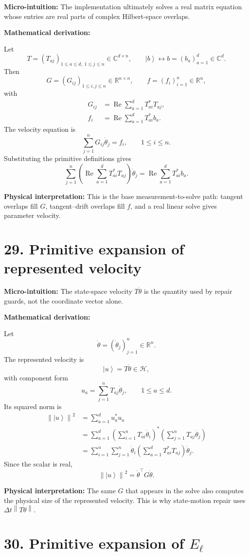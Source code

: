 \documentclass[10pt,twocolumn]{article}
\newcommand{\ket}[1]{\left|#1\right\rangle}
\newcommand{\norm}[1]{\left\lVert #1\right\rVert}
\newcommand{\R}{\mathbb R}
\newcommand{\C}{\mathbb C}
\newcommand{\Hh}{\mathcal H}
\newcommand{\Real}{\operatorname{Re}}
\newcommand{\micro}[1]{%
  \par\smallskip
  \noindent\textcolor{deepblue}{\textbf{Micro-intuition:}} #1
  \par\smallskip}
\newcommand{\deriv}{%
  \par\noindent\textcolor{deepviolet}{\textbf{Mathematical derivation:}}\par\vspace{-1mm}}
\newcommand{\phys}[1]{%
  \par\smallskip
  \noindent\textcolor{deepgreen}{\textbf{Physical interpretation:}} #1
  \par\smallskip}
\begin{document}
\micro{The implementation ultimately solves a real matrix equation whose
entries are real parts of complex Hilbert-space overlaps.}

\deriv
Let
\[
T=(T_{aj})_{1\le a\le d,\;1\le j\le n}\in\C^{d\times n},
\qquad
\ket b\leftrightarrow b=(b_a)_{a=1}^{d}\in\C^d.
\]
Then
\[
G=(G_{ij})_{1\le i,j\le n}\in\R^{n\times n},
\qquad
f=(f_i)_{i=1}^{n}\in\R^n,
\]
with
\[
\begin{aligned}
G_{ij}
&=\Real\sum_{a=1}^{d}T_{ai}^*T_{aj},\\
f_i
&=\Real\sum_{a=1}^{d}T_{ai}^*b_a.
\end{aligned}
\]
The velocity equation is
\[
\sum_{j=1}^{n}G_{ij}\dot\theta_j=f_i,
\qquad
1\le i\le n.
\]
Substituting the primitive definitions gives
\[
\sum_{j=1}^{n}
\left(
\Real\sum_{a=1}^{d}T_{ai}^*T_{aj}
\right)
\dot\theta_j
=
\Real\sum_{a=1}^{d}T_{ai}^*b_a.
\]

\phys{This is the base measurement-to-solve path: tangent overlaps fill \(G\),
tangent--drift overlaps fill \(f\), and a real linear solve gives parameter
velocity.}

\section*{29. Primitive expansion of represented velocity}

\micro{The state-space velocity \(T\dot\theta\) is the quantity used by repair
guards, not the coordinate vector alone.}

\deriv
Let
\[
\dot\theta=(\dot\theta_j)_{j=1}^{n}\in\R^n.
\]
The represented velocity is
\[
\ket u=T\dot\theta\in\Hh,
\]
with component form
\[
u_a=\sum_{j=1}^{n}T_{aj}\dot\theta_j,
\qquad
1\le a\le d.
\]
Its squared norm is
\[
\begin{aligned}
\norm{\ket u}^2
&=\sum_{a=1}^{d}u_a^*u_a\\
&=
\sum_{a=1}^{d}
\left(\sum_{i=1}^{n}T_{ai}\dot\theta_i\right)^*
\left(\sum_{j=1}^{n}T_{aj}\dot\theta_j\right)\\
&=
\sum_{i=1}^{n}\sum_{j=1}^{n}
\dot\theta_i
\left(\sum_{a=1}^{d}T_{ai}^*T_{aj}\right)
\dot\theta_j.
\end{aligned}
\]
Since the scalar is real,
\[
\norm{\ket u}^2=\dot\theta^\top G\dot\theta.
\]

\phys{The same \(G\) that appears in the solve also computes the physical size
of the represented velocity. This is why state-motion repair uses
\(\Delta t\norm{T\dot\theta}\).}

\section*{30. Primitive expansion of \(E_\ell\)}
\end{document}
